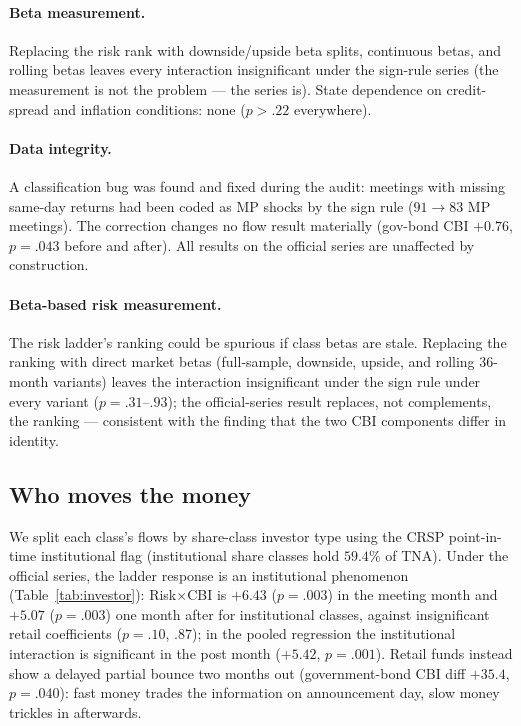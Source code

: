 \documentclass[11pt]{article}
\begin{document}
\paragraph{Beta measurement.} Replacing the risk rank with downside/upside
beta splits, continuous betas, and rolling betas leaves every interaction
insignificant under the sign-rule series (the measurement is not the
problem --- the series is). State dependence on credit-spread and inflation
conditions: none ($p>.22$ everywhere).

\paragraph{Data integrity.} A classification bug was found and fixed during
the audit: meetings with missing same-day returns had been coded as MP shocks
by the sign rule ($91\to83$ MP meetings). The correction changes no flow
result materially (gov-bond CBI $+0.76$, $p=.043$ before and after). All
results on the official series are unaffected by construction.

\paragraph{Beta-based risk measurement.} The risk ladder's ranking could be
spurious if class betas are stale. Replacing the ranking with direct market
betas (full-sample, downside, upside, and rolling 36-month variants) leaves
the interaction insignificant under the sign rule under every variant
($p = .31$--$.93$); the official-series result replaces, not complements,
the ranking --- consistent with the finding that the two CBI components
differ in identity.

\subsection{Who moves the money}\label{sec:whomoves}

We split each class's flows by share-class investor type using the CRSP
point-in-time institutional flag (institutional share classes hold $59.4\%$
of TNA). Under the official series, the ladder response is an institutional
phenomenon (Table~\ref{tab:investor}): Risk$\times$CBI is $+6.43$ ($p=.003$)
in the meeting month and $+5.07$ ($p=.003$) one month after for
institutional classes, against insignificant retail coefficients
($p=.10$, $.87$); in the pooled regression the institutional interaction is
significant in the post month ($+5.42$, $p=.001$). Retail funds instead
show a delayed partial bounce two months out (government-bond CBI diff
$+35.4$, $p=.040$): fast money trades the information on announcement day,
slow money trickles in afterwards.
\end{document}
